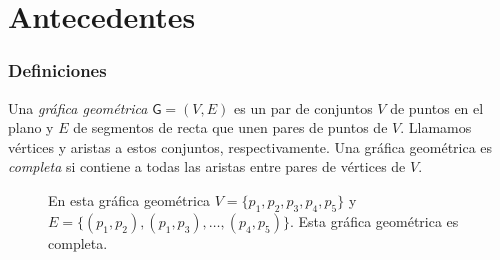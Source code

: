 \section{Antecedentes}

\begin{frame}
\frametitle{Definiciones}
Una \emph{gráfica geométrica} $\mathsf{G}=(V,E)$ es un par de conjuntos $V$ de puntos en el plano y $E$ de 
segmentos de recta que unen pares de puntos de $V$. Llamamos vértices y aristas a estos conjuntos,
respectivamente. Una gráfica geométrica es \emph{completa} si contiene a todas las 
aristas entre pares de vértices de $V$.
\begin{figure}
	\centering
	\caption{En esta gráfica geométrica $V=\{p_1,p_2,p_3,p_4,p_5\}$ y $E=\{(p_1,p_2),(p_1,p_3),\dots,(p_4,p_5)\}			$. Esta gráfica geométrica es completa.}
\end{figure}
\end{frame}